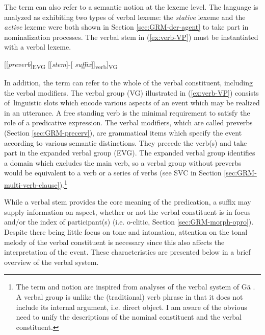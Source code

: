 \begin{exe}
\begin{exe}
\begin{exe}
{\begin{exe}
\begin{exe}
\begin{exe}
\begin{exe}
\begin{exe}
\begin{exe}
\begin{exe}
\begin{xlist}
\begin{exe}
\begin{exe}
\begin{exe}
\begin{exe}
\begin{exe}
\begin{exe}
\begin{exe}
\begin{exe}
\begin{exe}
\begin{exe}
\begin{exe}
\begin{exe}
\begin{exe}
The term  can also refer to a semantic notion at the lexeme 
level. The language is analyzed as exhibiting two types of verbal lexeme: the 
{\it stative} lexeme and the {\it active} lexeme were both shown in Section 
\ref{sec:GRM-der-agent} to take  part in 
nominalization processes. The verbal stem in (\ref{ex:verb-VP})  must be 
instantiated with a verbal lexeme. 

\ea\label{ex:verb-VP}
[[{\it preverb}]\textsubscript{EVG} [[{\it stem}]-[{\it 
suffix}]]\textsubscript{verb}]\textsubscript{VG}
\z


In addition, the term  can refer to the 
whole of the verbal constituent, including the verbal modifiers. The verbal 
group   (VG) illustrated in (\ref{ex:verb-VP})
consists of linguistic slots which encode   various aspects of an event  which
may be realized in an utterance. A free standing verb is the minimal requirement
to satisfy the role of a predicative expression. The verbal modifiers, which
are called preverbs (Section \ref{sec:GRM-precerv}),  are grammatical items 
which specify the event
according to various  semantic distinctions. They precede the  verb(s) and take
part in the expanded verbal group  (EVG). The 
expanded verbal group
identifies  a domain which excludes the main verb, so a  verbal group
without preverbs would  be equivalent to a verb or a series of verbs (see SVC in
Section \ref{sec:GRM-multi-verb-clause}).\footnote{The term and notion are 
inspired from
analyses of the verbal system of Gã \citep{Daku70}. A verbal group is unlike 
the
(traditional) verb phrase in that it does not include its internal argument,
i.e. direct object. I am aware of the obvious need to unify the descriptions of
the nominal constituent and the verbal constituent.} 


While a verbal stem provides the core meaning of the predication,  a suffix may 
supply information on  aspect, whether or not the verbal constituent is in focus 
and/or the index of participant(s) (i.e. {\sc o}-clitic, Section 
\ref{sec:GRM-morph-opro}).  Despite there being little focus on tone and 
intonation, attention on the tonal melody of the verbal constituent is necessary 
since this also affects the interpretation of the event. These characteristics 
are presented below in a brief overview of the verbal system. 

% 




\end{exe}
\end{exe}
\end{exe}
\end{exe}
\end{exe}
\end{exe}
\end{exe}
\end{exe}
\end{exe}
\end{exe}
\end{exe}
\end{exe}
\end{exe}
\end{xlist}
\end{exe}
\end{exe}
\end{exe}
\end{exe}
\end{exe}
\end{exe}
\end{exe}}
\end{exe}
\end{exe}
\end{exe}
